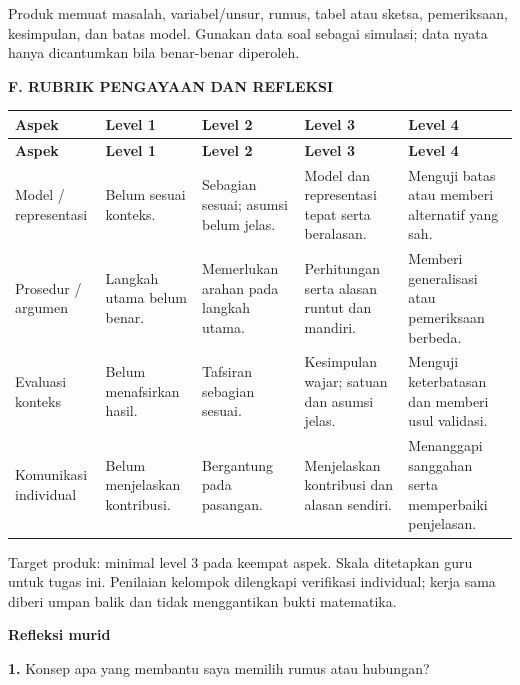 \documentclass[11pt,a4paper]{article}
\begin{document}
{\small Produk memuat masalah, variabel/unsur, rumus, tabel atau sketsa, pemeriksaan, kesimpulan, dan batas model. Gunakan data soal sebagai simulasi; data nyata hanya dicantumkan bila benar-benar diperoleh.\par}\medskip
\clearpage
\begin{center}\bfseries\large F. RUBRIK PENGAYAAN DAN REFLEKSI\end{center}\medskip
{\small\setlength{\tabcolsep}{2mm}\renewcommand{\arraystretch}{1.35}\begin{longtable}{|>{\raggedright\arraybackslash}p{27.873mm}|>{\raggedright\arraybackslash}p{26.606mm}|>{\raggedright\arraybackslash}p{29.140mm}|>{\raggedright\arraybackslash}p{35.474mm}|>{\raggedright\arraybackslash}p{38.008mm}|}\hline
\rowcolor{gray!10}\textbf{Aspek} & \textbf{Level 1} & \textbf{Level 2} & \textbf{Level 3} & \textbf{Level 4}\\ \hline
\endfirsthead
\rowcolor{gray!10}\textbf{Aspek} & \textbf{Level 1} & \textbf{Level 2} & \textbf{Level 3} & \textbf{Level 4}\\ \hline
\endhead
Model / representasi & Belum sesuai konteks. & Sebagian sesuai; asumsi belum jelas. & Model dan representasi tepat serta beralasan. & Menguji batas atau memberi alternatif yang sah.\\ \hline
Prosedur / argumen & Langkah utama belum benar. & Memerlukan arahan pada langkah utama. & Perhitungan serta alasan runtut dan mandiri. & Memberi generalisasi atau pemeriksaan berbeda.\\ \hline
Evaluasi konteks & Belum menafsirkan hasil. & Tafsiran sebagian sesuai. & Kesimpulan wajar; satuan dan asumsi jelas. & Menguji keterbatasan dan memberi usul validasi.\\ \hline
Komunikasi individual & Belum menjelaskan kontribusi. & Bergantung pada pasangan. & Menjelaskan kontribusi dan alasan sendiri. & Menanggapi sanggahan serta memperbaiki penjelasan.\\ \hline
\end{longtable}}\medskip
{\small Target produk: minimal level 3 pada keempat aspek. Skala ditetapkan guru untuk tugas ini. Penilaian kelompok dilengkapi verifikasi individual; kerja sama diberi umpan balik dan tidak menggantikan bukti matematika.\par}\medskip
\par\medskip\noindent\textbf{Refleksi murid}\par\smallskip
\noindent\textbf{1.} Konsep apa yang membantu saya memilih rumus atau hubungan?\par\vspace{6mm}
\end{document}
